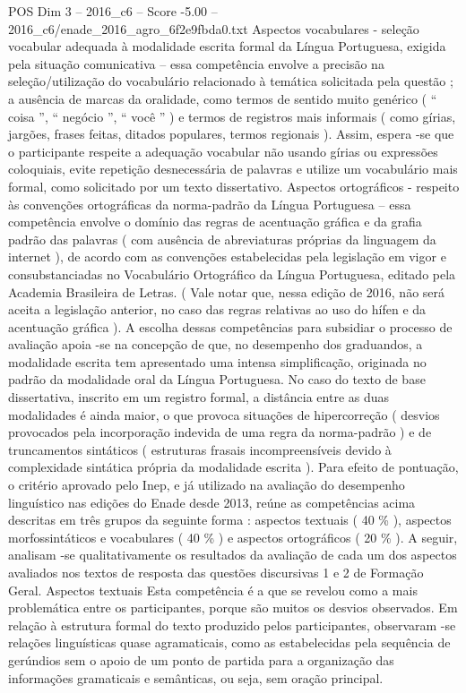 \begin{textsample}{POS Dim 3 – 2016\_c6 – Score -5.00 – 2016\_c6/enade\_2016\_agro\_6f2e9fbda0.txt}
Aspectos vocabulares - seleção vocabular adequada à modalidade escrita formal da Língua Portuguesa, exigida pela situação comunicativa – essa competência envolve a precisão na seleção/utilização do vocabulário relacionado à temática solicitada pela questão ; a ausência de marcas da oralidade, como termos de sentido muito genérico ( “ coisa ”, “ negócio ”, “ você ” ) e termos de registros mais informais ( como gírias, jargões, frases feitas, ditados populares, termos regionais ).
Assim, espera -se que o participante respeite a adequação vocabular não usando gírias ou expressões coloquiais, evite repetição desnecessária de palavras e utilize um vocabulário mais formal, como solicitado por um texto dissertativo.
Aspectos ortográficos - respeito às convenções ortográficas da norma-padrão da Língua Portuguesa – essa competência envolve o domínio das regras de acentuação gráfica e da grafia padrão das palavras ( com ausência de abreviaturas próprias da linguagem da internet ), de acordo com as convenções estabelecidas pela legislação em vigor e consubstanciadas no Vocabulário Ortográfico da Língua Portuguesa, editado pela Academia Brasileira de Letras. ( Vale notar que, nessa edição de 2016, não será aceita a legislação anterior, no caso das regras relativas ao uso do hífen e da acentuação gráfica ).
A escolha dessas competências para subsidiar o processo de avaliação apoia -se na concepção de que, no desempenho dos graduandos, a modalidade escrita tem apresentado uma intensa simplificação, originada no padrão da modalidade oral da Língua Portuguesa.
No caso do texto de base dissertativa, inscrito em um registro formal, a distância entre as duas modalidades é ainda maior, o que provoca situações de hipercorreção ( desvios provocados pela incorporação indevida de uma regra da norma-padrão ) e de truncamentos sintáticos ( estruturas frasais incompreensíveis devido à complexidade sintática própria da modalidade escrita ).
Para efeito de pontuação, o critério aprovado pelo Inep, e já utilizado na avaliação do desempenho linguístico nas edições do Enade desde 2013, reúne as competências acima descritas em três grupos da seguinte forma : aspectos textuais ( 40 \% ), aspectos morfossintáticos e vocabulares ( 40 \% ) e aspectos ortográficos ( 20 \% ).
A seguir, analisam -se qualitativamente os resultados da avaliação de cada um dos aspectos avaliados nos textos de resposta das questões discursivas 1 e 2 de Formação Geral.
Aspectos textuais Esta competência é a que se revelou como a mais problemática entre os participantes, porque são muitos os desvios observados.
Em relação à estrutura formal do texto produzido pelos participantes, observaram -se relações linguísticas quase agramaticais, como as estabelecidas pela sequência de gerúndios sem o apoio de um ponto de partida para a organização das informações gramaticais e semânticas, ou seja, sem oração principal.

\end{textsample}
